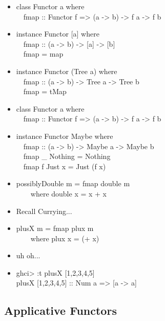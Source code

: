 \documentclass{beamer}                  %
\newcommand{\srule}{
	\rule{\textwidth}{1pt}\\
}
\newlength{\subsecwidth}
\newenvironment{slide}{
	\begin{frame} %
	\settowidth{\subsecwidth}{\insertsubsection} %
	\ifthenelse{\dimtest{\subsecwidth}{<}{1pt}}{ %
		\frametitle{\insertsection\\             %
		\vspace{-1ex}                            %
		\color{fore}\srule                       %
		\par                                     %
		\vspace{-3ex}                            %
		}
	}{                                           %
		\frametitle{\insertsection\ -- \insertsubsection\\ %
		\vspace{-1ex}                            %
		\color{fore}\srule                       %
		\par                                     %
		\vspace{-3ex}                            %
		}
	}
	\Large                                       %
}{
	\end{frame}
}
\begin{document}
\begin{slide}
  \begin{itemize}
    \item
      class Functor a where\\
      ~~fmap :: Functor f => (a -> b) -> f a -> f b
    \item
      instance Functor [a] where\\
      ~~fmap :: (a -> b) -> [a] -> [b]\\
      ~~fmap = map
    \item
      instance Functor (Tree a) where\\
      ~~fmap :: (a -> b) -> Tree a -> Tree b\\
      ~~fmap = tMap
  \end{itemize}
\end{slide}

\begin{slide}
  \begin{itemize}
    \item
      class Functor a where\\
      ~~fmap :: Functor f => (a -> b) -> f a -> f b
    \item
      instance Functor Maybe where\\
      ~~fmap :: (a -> b) -> Maybe a -> Maybe b\\
      ~~fmap \_ Nothing = Nothing\\
      ~~fmap f Just x = Just (f x)
    \item possiblyDouble m = fmap double m\\
      ~~~~where double x = x + x
  \end{itemize}
\end{slide}

\begin{slide}
  \begin{itemize}
    \item Recall Currying...
    \item plusX m = fmap plux m\\
      ~~~~where plux x = (+ x)
    \item uh oh...
    \item ghci> :t plusX [1,2,3,4,5]\\
      plusX [1,2,3,4,5] :: Num a => [a -> a]
  \end{itemize}
\end{slide}

\subsection{Applicative Functors}
\end{document}
